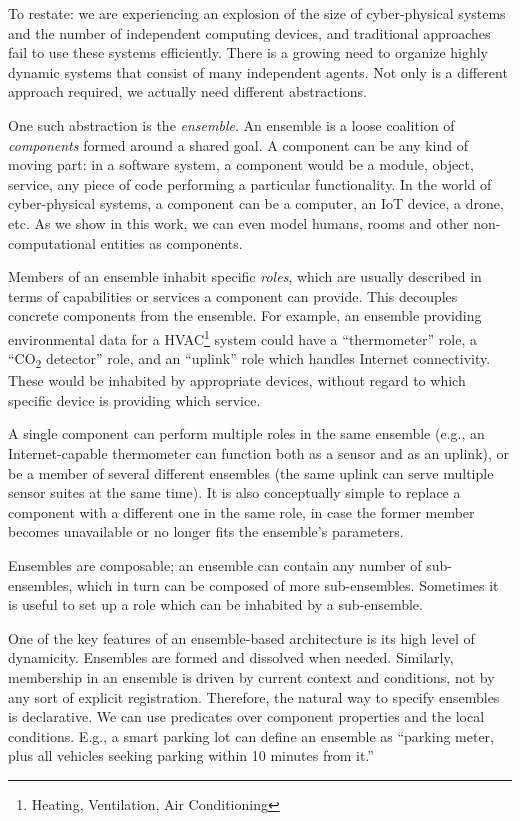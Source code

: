 To restate: we are experiencing an explosion of the size of cyber-physical systems and
the number of independent computing devices, and traditional approaches fail to use
these systems efficiently. There is a growing need to organize highly dynamic systems
that consist of many independent agents. Not only is a different approach required, we
actually need different abstractions.

\medskip

One such abstraction is the \textit{ensemble}. An ensemble is a loose coalition of
\textit{components} formed around a shared goal. A component can be any kind of moving
part: in a software system, a component would be a module, object, service, any piece of
code performing a particular functionality. In the world of cyber-physical systems, a
component can be a computer, an IoT device, a drone, etc. As we show in this work, we
can even model humans, rooms and other non-computational entities as components.

Members of an ensemble inhabit specific \textit{roles}, which are usually described in
terms of capabilities or services a component can provide. This decouples concrete
components from the ensemble. For example, an ensemble providing environmental data for
a HVAC\footnote{Heating, Ventilation, Air Conditioning} system could have a
``thermometer'' role, a ``CO\textsubscript{2} detector'' role, and an ``uplink'' role
which handles Internet connectivity. These would be inhabited by appropriate devices,
without regard to which specific device is providing which service.

A single component can perform multiple roles in the same ensemble (e.g., an
Internet-capable thermometer can function both as a sensor and as an uplink), or be a
member of several different ensembles (the same uplink can serve multiple sensor suites
at the same time). It is also conceptually simple to replace a component with a
different one in the same role, in case the former member becomes unavailable or no
longer fits the ensemble's parameters.

Ensembles are composable; an ensemble can contain any number of sub-ensembles, which in
turn can be composed of more sub-ensembles. Sometimes it is useful to set up a role
which can be inhabited by a sub-ensemble.

\medskip

One of the key features of an ensemble-based architecture is its high level of
dynamicity. Ensembles are formed and dissolved when needed. Similarly, membership in an
ensemble is driven by current context and conditions, not by any sort of explicit
registration. Therefore, the natural way to specify ensembles is declarative. We can use
predicates over component properties and the local conditions. E.g., a smart parking lot
can define an ensemble as ``parking meter, plus all vehicles seeking parking within 10
minutes from it.''

